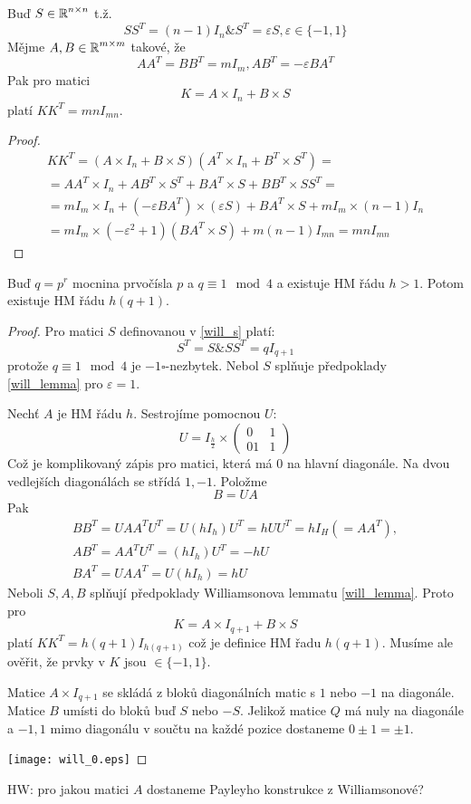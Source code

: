 \begin{lemma}[Williamson]\label{will_lemma}
    Buď $S\in\operatorname{\mathbb{R}}^{n\times n}$ t.ž.
    \[ SS^T=(n-1)I_n \& S^T=\varepsilon S, \varepsilon\in \{-1,1\} \]
    Mějme $A,B\in\operatorname{\mathbb{R}}^{m\times m}$ takové, že
    \[ AA^T=BB^T=mI_m, AB^T=-\varepsilon BA^T \]
    Pak pro matici
    \[ K=A\times I_n + B\times S \]
    platí $KK^T=mnI_{mn}$.
\end{lemma}
\begin{proof}
	\begin{gather*}
		KK^T = (A \times I_n + B \times S)(A^T \times I_n + B^T \times S^T) = \\
		= AA^T \times I_n + AB^T \times S^T + BA^T \times S + BB^T \times SS^T = \\
		= m I_m \times I_n + (-\varepsilon BA^T) \times (\varepsilon S) + BA^T \times S + m I_m \times (n - 1)  I_n \\
		= m I_m \times (-\varepsilon^2 + 1)(BA^T \times S) + m(n - 1) I_{mn} = mn I_{mn}
	\end{gather*}
\end{proof}
\begin{theorem}
    Buď $q=p^r$ mocnina prvočísla $p$ a $q\equiv 1\mod 4$ a existuje HM řádu $h>1$.
    Potom existuje HM řádu $h(q+1)$.
\end{theorem}
\begin{proof}
	Pro matici $S$ definovanou v \eqref{will_s} platí:
	\[ S^T = S \& SS^T = q I_{q + 1} \]
	protože $q \equiv 1 \mod4$ je $-1 \square$-nezbytek. Nebol $S$ splňuje předpoklady \cref{will_lemma} pro $\varepsilon = 1$.

	Nechť $A$ je HM řádu $h$.
	Sestrojíme pomocnou $U$:
	\[ U = I_{\frac{h}{2}} \times \begin{pmatrix} 0 & 1 \\ 01 & 1 \end{pmatrix} \]
	Což je komplikovaný zápis pro matici, která má 0 na hlavní diagonále.
	Na dvou vedlejších diagonálách se střídá $1, -1$.
	Položme
	\[ B = UA \]
	Pak
	\begin{gather*}
		BB^T = UAA^TU^T = U(hI_h)U^T = hUU^T = hI_H(= AA^T), \\
		AB^T = AA^TU^T = (hI_h)U^T = -hU\\
		BA^T = UAA^T = U(hI_h) = hU
	\end{gather*}
	Neboli $S, A, B$ splňují předpoklady Williamsonova lemmatu \cref{will_lemma}.
	Proto pro
	\[ K = A \times I_{q + 1} + B \times S \]
	platí $KK^T = h(q + 1)I_{h(q + 1)}$ což je definice HM řadu $h(q + 1)$.
	Musíme ale ověřit, že prvky v $K$ jsou $\in \{ -1, 1 \}$.

	Matice $A \times I_{q + 1}$ se skládá z bloků diagonálních matic s $1$ nebo $-1$ na diagonále.
	Matice $B$ umísti do bloků buď $S$ nebo $-S$.
	Jelikož matice $Q$ má nuly na diagonále a ${-1, 1}$ mimo diagonálu v součtu na každé pozice dostaneme $0 \pm 1 = \pm 1$.

	\texttt{[image: will\_0.eps]}
\end{proof}

HW: pro jakou matici $A$ dostaneme Payleyho konstrukce z Williamsonové?
